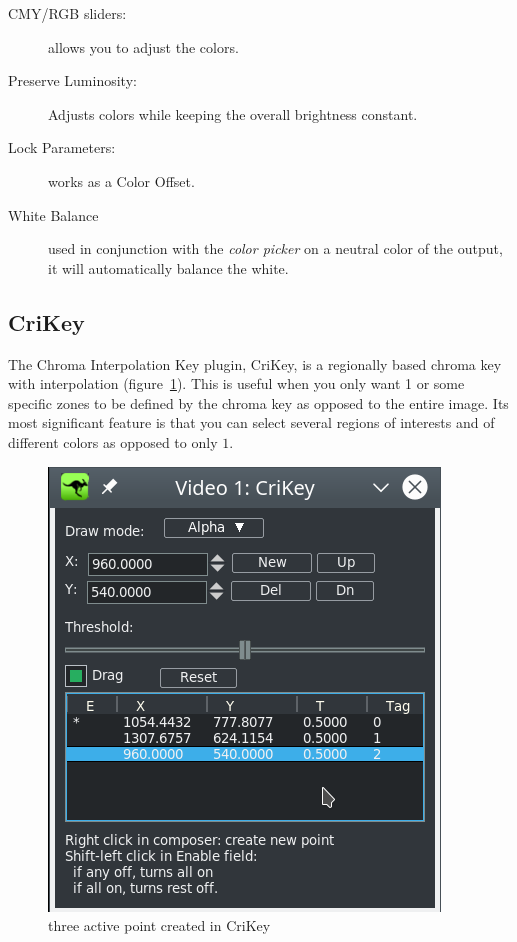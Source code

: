 \begin{description}
    \item[CMY/RGB sliders:] allows you to adjust the colors.
    \item[Preserve Luminosity:] Adjusts colors while keeping the overall brightness constant.
    \item[Lock Parameters:] works as a Color Offset.
    \item[White Balance] used in conjunction with the \textit{color picker} on a neutral color of the output, it will automatically balance the white.
\end{description}

\subsection{CriKey}%
\label{sub:crikey}

The Chroma Interpolation Key plugin, CriKey, is a regionally based chroma key with interpolation (figure~\ref{fig:crikey}). This is useful when you only want 1 or some specific zones to be defined by the chroma key as opposed to the entire image. Its most significant feature is that you can select several regions of interests and of different colors as opposed to only $1$.

\begin{figure}[htpb]
    \centering
    \includegraphics[width=0.6\linewidth]{images/crikey.png}
    \caption{three active point created in CriKey}
    \label{fig:crikey}
\end{figure}

